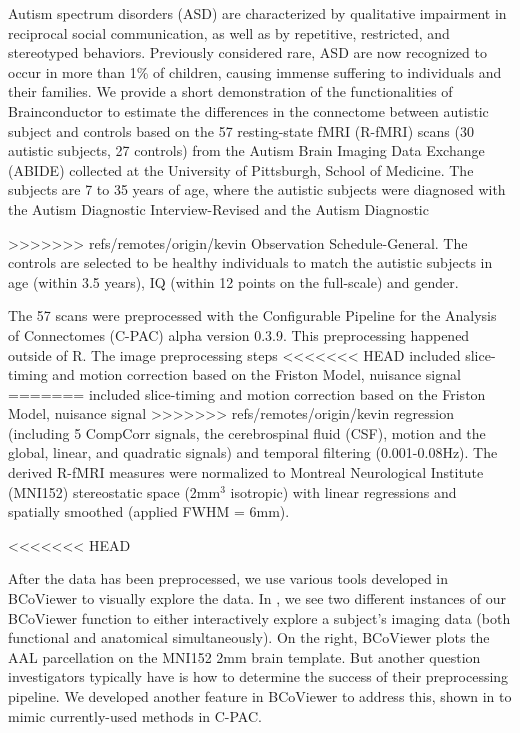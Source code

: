 \documentclass{nature}
\begin{document}
{Autism spectrum disorders (ASD) are characterized by qualitative impairment in
reciprocal social communication, as well as by repetitive, restricted, and
stereotyped behaviors. Previously considered rare, ASD are now recognized to
occur in more than 1\% of children, causing immense suffering to individuals and
their families. 
We provide a short demonstration of the functionalities of Brainconductor to
estimate the differences in the connectome between autistic subject and controls
based
on the 57 resting-state fMRI (R-fMRI) scans (30 autistic subjects, 27 controls)
from the Autism
Brain Imaging Data Exchange (ABIDE) collected at the 
University of Pittsburgh, School of Medicine\cite{di2014autism}. 
The subjects are 7 to 35 years of age, where the autistic subjects were
diagnosed with the Autism Diagnostic Interview-Revised and the Autism Diagnostic

>>>>>>> refs/remotes/origin/kevin
Observation Schedule-General. The controls are selected to be healthy
individuals to match the autistic subjects in age (within 3.5 years), IQ (within
12 points on the full-scale) and gender.

The 57 scans were preprocessed with the Configurable Pipeline for the Analysis
of Connectomes (C-PAC) alpha version 0.3.9. This preprocessing 
happened outside of R. The image preprocessing steps
<<<<<<< HEAD
included slice-timing and motion correction based on the Friston Model, nuisance signal
=======
included slice-timing and motion correction based on the Friston Model, nuisance
signal
>>>>>>> refs/remotes/origin/kevin
regression (including 5 CompCorr signals, the cerebrospinal fluid (CSF), motion
 and the global, linear, and quadratic
signals) and temporal filtering (0.001-0.08Hz). The derived R-fMRI measures
were normalized to Montreal Neurological Institute (MNI152) stereostatic
space (2mm$^3$ isotropic) with linear regressions and spatially smoothed
(applied FWHM = 6mm). 

<<<<<<< HEAD

After the data has been preprocessed, we use various tools developed in BCoViewer
to visually explore the data. In , we see two different instances
of our BCoViewer function to either interactively explore a subject's imaging data (both
functional and anatomical simultaneously). On the right, BCoViewer plots the AAL parcellation
on the MNI152 2mm brain template. But another question investigators typically have is 
how to determine the success of their preprocessing pipeline. We developed another feature
in BCoViewer to address this, shown in  to mimic currently-used methods
in C-PAC.


}
\end{document}
